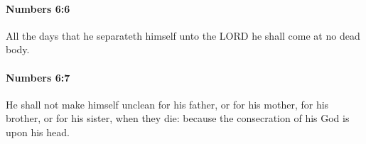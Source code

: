 		\paragraph{Numbers 6:6} %
			\label{NUMBERS-6-6}

			All the days that he separateth himself unto the LORD he shall come at no dead body.


		\paragraph{Numbers 6:7} %
			\label{NUMBERS-6-7}

			He shall not make himself unclean for his father, or for his mother, for his brother, or for his sister, when they die: because the consecration of his God is upon his head.


